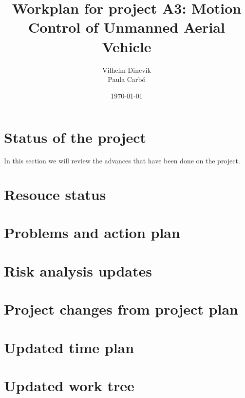 \documentclass{article}
\title{Workplan for project A3: Motion Control of Unmanned Aerial Vehicle}
\author{Vilhelm Dinevik \\ Paula Carbó}
\date{\today}
\begin{document}
	\maketitle
	
	\bigskip
	\tableofcontents
	\newpage
\section{Status of the project}
In this section we will review the advances that have been done on the project.  
\section{Resouce status}
\section{Problems and action plan}
\section{Risk analysis updates}
\section{Project changes from project plan}
\appendix
\section{Updated time plan}
\section{Updated work tree}
	
\end{document}
